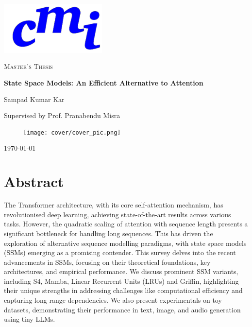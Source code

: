 \documentclass[12pt,a4paper]{report}
\begin{document}

\begin{titlepage}
    \centering
    \includegraphics[width=0.4\textwidth]{cmi-header.png}\par\vspace{1cm}
    {\scshape\Large Master's Thesis\par}
    \vspace{1.5cm}
    {\huge\bfseries State Space Models: An Efficient Alternative to Attention\par}
    \vspace{2cm}
    {\Large Sampad Kumar Kar\par}
    \vspace{0.5cm}
    {\Large Supervised by Prof. Pranabendu Misra\par}

    \vspace{2cm}

    \begin{figure}[h]
        \centering
        \texttt{[image: cover/cover\_pic.png]}
    \end{figure}
    
    \vfill

    {\large \today\par}
\end{titlepage}

\chapter*{Abstract}
The Transformer architecture, with its core self-attention mechanism, has revolutionised deep learning, achieving state-of-the-art results across various tasks. However, the quadratic scaling of attention with sequence length presents a significant bottleneck for handling long sequences. This has driven the exploration of alternative sequence modelling paradigms, with state space models (SSMs) emerging as a promising contender. This survey delves into the recent advancements in SSMs, focusing on their theoretical foundations, key architectures, and empirical performance. We discuss prominent SSM variants, including S4, Mamba, Linear Recurrent Units (LRUs) and Griffin, highlighting their unique strengths in addressing challenges like computational efficiency and capturing long-range dependencies. We also present experimentals on toy datasets, demonstrating their performance in text, image, and audio generation using tiny LLMs.
\end{document}
